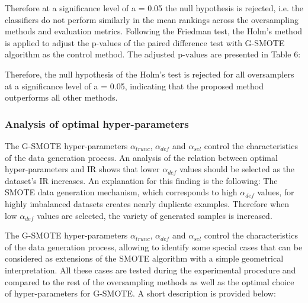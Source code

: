 \documentclass[parskip=full]{scrartcl}
\begin{document}
Therefore at a significance level of a = 0.05 the null hypothesis is rejected,
i.e. the classifiers do not perform similarly in the mean rankings across the
oversampling methods and evaluation metrics. Following the Friedman test, the
Holm's method is applied to adjust the p-values of the paired difference test
with G-SMOTE algorithm as the control method. The adjusted $\text{p-values}$ are
presented in Table 6:


Therefore, the null hypothesis of the Holm's test is rejected for all
oversamplers at a significance level of a = 0.05, indicating that the proposed
method outperforms all other methods.

\subsubsection{Analysis of optimal hyper-parameters}

The G-SMOTE hyper-parameters \( \alpha_{trunc} \), \( \alpha_{def} \) and
\(\alpha_{sel} \) control the characteristics of the data generation process. An
analysis of the relation between optimal hyper-parameters and IR shows that
lower \( \alpha_{def} \) values should be selected as the dataset's IR
increases. An explanation for this finding is the following: The SMOTE data
generation mechanism, which corresponds to high \( \alpha_{def} \) values, for
highly imbalanced datasets  creates nearly duplicate examples.  Therefore when
low \( \alpha_{def} \) values are selected, the variety of generated samples is
increased.

The G-SMOTE hyper-parameters \( \alpha_{trunc} \), \( \alpha_{def} \) and \(
\alpha_{sel} \) control the characteristics of the data generation process,
allowing to identify some special cases that can be considered as extensions of
the SMOTE algorithm with a simple geometrical interpretation. All these cases
are tested during the experimental procedure and compared to the rest of the
oversampling methods as well as the optimal choice of hyper-parameters for
G-SMOTE. A short description is provided below:
\end{document}
